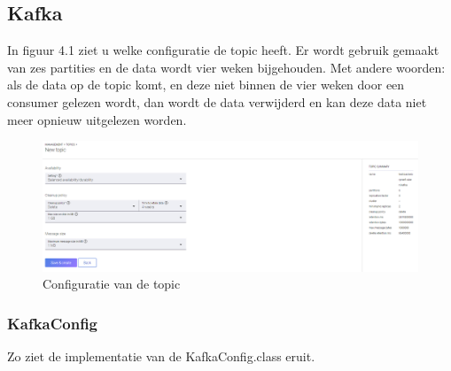 \subsection{Kafka}
In figuur 4.1 ziet u welke configuratie de topic heeft. Er wordt gebruik gemaakt van zes partities en de data wordt vier weken bijgehouden. Met andere woorden: als de data op de topic komt, en deze niet binnen de vier weken door een consumer gelezen wordt, dan wordt de data verwijderd en kan deze data niet meer opnieuw uitgelezen worden.
\begin{figure}[h!]
    \centering
    \includegraphics[width=140mm]{../kafkaConfig.png}
    \caption{Configuratie van de topic}
    
\end{figure}
\subsubsection{KafkaConfig}
Zo ziet de implementatie van de KafkaConfig.class eruit.

